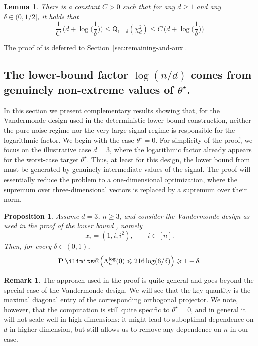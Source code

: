 \documentclass[11pt, letterpaper, hidelinks]{article}
\makeatletter
\newcommand{\1}{\mathbf 1}
\renewcommand{\leq}{\leqslant}
\renewcommand{\geq}{\geqslant}
\renewcommand{\P}{\operatorname*{\mathbf{P}}\ilimits@}
\theoremstyle{plain}
\newtheorem{lemma}{Lemma}[section]
\newtheorem{proposition}{Proposition}[section]
\theoremstyle{definition}
\newtheorem{remark}{Remark}[section]
\newcommand{\thetastar}{\theta^\star}
\newcommand{\Quant}[1]{\mathsf{Q}_{#1}}
\makeatother
\begin{document}
\begin{lemma}
\label{lem:chisquarequantiles}
There is a constant $C > 0$ such that for any $d \geq 1$ and any $\delta \in (0, 1/2]$, it holds that 
\[
	\frac{1}{C}\, 
	\bigg(d + \log\Big(\frac{1}{\delta}\Big)\bigg) 
	\leq \Quant{1-\delta}(\chi^2_d) \leq 
	C\, \bigg(d + \log\Big(\frac{1}{\delta}\Big)\bigg) 
\]
\end{lemma}
The proof of  is deferred to Section~\ref{sec:remaining-and-aux}.










\subsection{The lower-bound factor $\log(n/d)$ comes from genuinely non-extreme values of $\theta^\star$.}

In this section we present complementary results showing that, for the Vandermonde design used in the deterministic lower bound construction, neither the pure noise regime nor the very large signal regime is responsible for the logarithmic factor. We begin with the case $\thetastar = 0$. For simplicity of the proof, we focus on the illustrative case $d = 3$, where the logarithmic factor already appears for the worst-case target $\thetastar$. Thus, at least for this design, the lower bound from  must be generated by genuinely intermediate values of the signal. The proof will essentially reduce the problem to a one-dimensional optimization, where the supremum over three-dimensional vectors is replaced by a supremum over their norm.

\begin{proposition}
\label{prop:vandermonde-zero-signal}
Assume $d = 3$, $n \geq 3$, and consider the Vandermonde design as used in the proof of the lower bound  , namely
\[
x_i = (1, i, i^2),
\qquad i \in [n].
\]
Then, for every $\delta \in (0,1)$,
\[
\P\Bigl(\Lambda_n^{\operatorname{log}}(0) \leq 216\log(6/\delta)\Bigr)\geq 1-\delta.
\]
\end{proposition}

\begin{remark}
The approach used in the proof is quite general and goes beyond the special case of the Vandermonde design. We will see that the key quantity is the maximal diagonal entry of the corresponding orthogonal projector. We note, however, that the computation is still quite specific to $\thetastar = 0$, and in general it will not scale well in high dimensions: it might lead to suboptimal dependence on $d$ in higher dimension, but still allows us to remove any dependence on $n$ in our case.
\end{remark}
\end{document}
